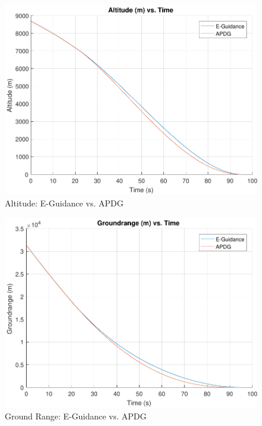 \begin{figure}[H]
	\centering
	\begin{minipage}{4.5 in}
		\includegraphics[width=\linewidth]{Figures/altEvsADPG.pdf}
		\caption{Altitude: E-Guidance vs. APDG \label{fig:altEvsADPG} }
	\end{minipage}
\end{figure}

\begin{figure}[H]
	\centering
	\begin{minipage}{4.5 in}
		\includegraphics[width=\linewidth]{Figures/rngEvsADPG.pdf}
		\caption{Ground Range: E-Guidance vs. APDG \label{fig:rngEvsADPG} }
	\end{minipage}
\end{figure}

